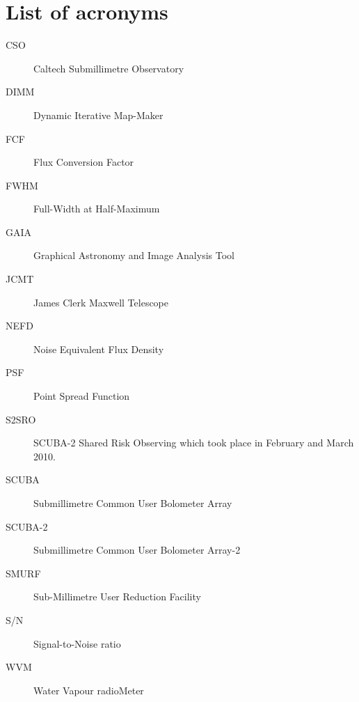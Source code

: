 \documentclass[twoside,11pt]{starlink}
\begin{document}
\section{List of acronyms}

\begin{description}

\item[CSO]\quad Caltech Submillimetre Observatory

\item[DIMM]\quad Dynamic Iterative Map-Maker

\item[FCF]\quad Flux Conversion Factor

\item[FWHM]\quad Full-Width at Half-Maximum

\item[GAIA]\quad Graphical Astronomy and Image Analysis Tool

\item[JCMT]\quad James Clerk Maxwell Telescope

\item[NEFD]\quad Noise Equivalent Flux Density

\item[PSF]\quad Point Spread Function

\item[S2SRO]\quad SCUBA-2 Shared Risk Observing which took place in
  February and March 2010.

\item[SCUBA]\quad Submillimetre Common User Bolometer Array

\item[SCUBA-2]\quad Submillimetre Common User Bolometer Array-2

\item[SMURF]\quad Sub-Millimetre User Reduction Facility

\item[S/N]\quad Signal-to-Noise ratio

\item[WVM]\quad Water Vapour radioMeter


\end{description}
\end{document}
